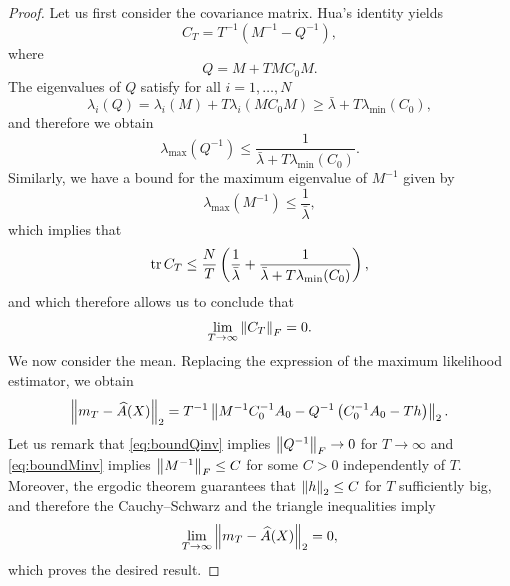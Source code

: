 \documentclass[10pt]{article}
\begin{document}
\begin{proof} Let us first consider the covariance matrix. Hua's identity yields
	\begin{equation}
		C_T = T^{-1} \left(M^{-1} - Q^{-1}\right),
	\end{equation}
	where 
	\begin{equation}
		Q = M + T M C_0 M.
	\end{equation}
	The eigenvalues of $Q$ satisfy for all $i = 1, \ldots, N$
	\begin{equation}
		\lambda_i(Q) = \lambda_i(M) + T \lambda_i(M C_0 M) \geq \bar \lambda + T \lambda_{\min}(C_0),
	\end{equation}
	and therefore we obtain
	\begin{equation}\label{eq:boundQinv}
		\lambda_{\max}(Q^{-1}) \leq \frac{1}{\bar \lambda + T \lambda_{\min}(C_0)}.
	\end{equation}
	Similarly, we have a bound for the maximum eigenvalue of $M^{-1}$ given by
	\begin{equation}\label{eq:boundMinv}
		\lambda_{\max}(M^{-1}) \leq \frac1{\bar{\lambda}},
	\end{equation}
	which implies that
	\begin{equation}
		\operatorname{tr}{C_T} \leq \frac{N}{T} \left(\frac1{\bar{\lambda}} + \frac{1}{\bar \lambda + T \lambda_{\min}(C_0)}\right),
	\end{equation}
	and which therefore allows us to conclude that
	\begin{equation}
		\lim_{T\to\infty} \left\|C_T\right\|_F = 0.
	\end{equation}
	We now consider the mean. Replacing the expression of the maximum likelihood estimator, we obtain
	\begin{equation}
		\left\|m_T - \widehat A(X)\right\|_2 = T^{-1}\left\|M^{-1}C_0^{-1}A_0 - Q^{-1}\left(C_0^{-1}A_0 - Th \right)\right\|_2.
	\end{equation}
	Let us remark that \eqref{eq:boundQinv} implies $\left\|Q^{-1}\right\|_F \to 0$ for $T \to \infty$ and \eqref{eq:boundMinv} implies $\left\|M^{-1}\right\|_F \leq C$ for some $C > 0$ independently of $T$. Moreover, the ergodic theorem guarantees that $\left\|h\right\|_2 \leq C$ for $T$ sufficiently big, and therefore the Cauchy--Schwarz and the triangle inequalities imply 
	\begin{equation}
		\lim_{T\to\infty} \left\|m_T - \widehat A(X)\right\|_2 = 0,
	\end{equation}
	which proves the desired result.
\end{proof}
\end{document}
